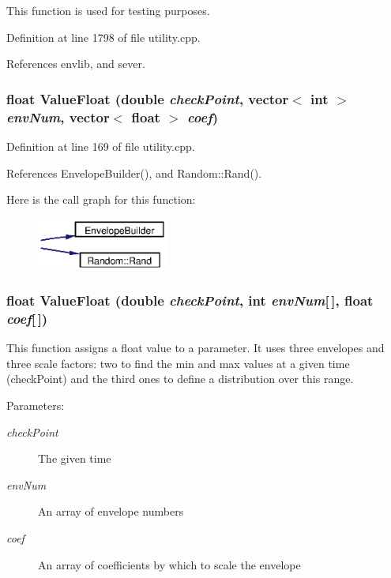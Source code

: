 This function is used for testing purposes. 

Definition at line 1798 of file utility.cpp.

References envlib, and sever.
\subsubsection{\setlength{\rightskip}{0pt plus 5cm}float Value\-Float (double {\em check\-Point}, vector$<$ int $>$ {\em env\-Num}, vector$<$ float $>$ {\em coef})}\label{utility_8h_a5}




Definition at line 169 of file utility.cpp.

References Envelope\-Builder(), and Random::Rand().

Here is the call graph for this function:\begin{figure}[H]
\begin{center}
\leavevmode
\includegraphics[width=122pt]{utility_8h_a5_cgraph}
\end{center}
\end{figure}
\subsubsection{\setlength{\rightskip}{0pt plus 5cm}float Value\-Float (double {\em check\-Point}, int {\em env\-Num}[$\,$], float {\em coef}[$\,$])}\label{utility_8h_a4}


This function assigns a float value to a parameter. It uses three envelopes and three scale factors: two to find the min and max values at a given time (check\-Point) and the third ones to define a distribution over this range. \begin{Desc}
\item[Parameters:]
\begin{description}
\item[{\em check\-Point}]The given time \item[{\em env\-Num}]An array of envelope numbers \item[{\em coef}]An array of coefficients by which to scale the envelope \end{description}
\end{Desc}


